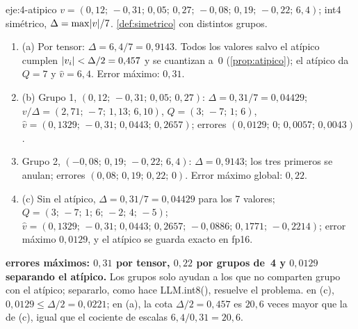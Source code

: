 \begin{solucion}{eje:4-atipico}
\datos $v=(0{,}12;\allowbreak\,-0{,}31;\allowbreak\,0{,}05;\allowbreak\,0{,}27;\allowbreak\,-0{,}08;\allowbreak\,0{,}19;\allowbreak\,-0{,}22;\allowbreak\,6{,}4)$; int4 simétrico, $\Delta=\max\lvert v\rvert/7$.
\planteamiento \cref{def:simetrico} con distintos grupos.
\pasos
\begin{enumerate}[label=\arabic*.]
  \item (a) Por tensor: $\Delta=6{,}4/7=0{,}9143$. Todos los valores salvo el atípico cumplen $\lvert v_i\rvert<\Delta/2=0{,}457$ y se cuantizan a~0 (\cref{prop:atipico}); el atípico da $Q=7$ y $\hat v=6{,}4$. Error máximo: $0{,}31$.
  \item (b) Grupo 1, $(0{,}12;\allowbreak\,-0{,}31;\allowbreak\,0{,}05;\allowbreak\,0{,}27)$: $\Delta=0{,}31/7=0{,}04429$; $v/\Delta=(2{,}71;\allowbreak\,-7;\allowbreak\,1{,}13;\allowbreak\,6{,}10)$, $Q=(3;\allowbreak\,-7;\allowbreak\,1;\allowbreak\,6)$, $\hat v=(0{,}1329;\allowbreak\,-0{,}31;\allowbreak\,0{,}0443;\allowbreak\,0{,}2657)$; errores $(0{,}0129;\allowbreak\,0;\allowbreak\,0{,}0057;\allowbreak\,0{,}0043)$.
  \item Grupo 2, $(-0{,}08;\allowbreak\,0{,}19;\allowbreak\,-0{,}22;\allowbreak\,6{,}4)$: $\Delta=0{,}9143$; los tres primeros se anulan; errores $(0{,}08;\allowbreak\,0{,}19;\allowbreak\,0{,}22;\allowbreak\,0)$. Error máximo global: $0{,}22$.
  \item (c) Sin el atípico, $\Delta=0{,}31/7=0{,}04429$ para los 7 valores; $Q=(3;\allowbreak\,-7;\allowbreak\,1;\allowbreak\,6;\allowbreak\,-2;\allowbreak\,4;\allowbreak\,-5)$; $\hat v=(0{,}1329;\allowbreak\,-0{,}31;\allowbreak\,0{,}0443;\allowbreak\,0{,}2657;\allowbreak\,-0{,}0886;\allowbreak\,0{,}1771;\allowbreak\,-0{,}2214)$; error máximo $0{,}0129$, y el atípico se guarda exacto en fp16.
\end{enumerate}
\resultado \textbf{errores máximos: $0{,}31$ por tensor, $0{,}22$ por grupos de~4 y $0{,}0129$ separando el atípico.} Los grupos solo ayudan a los que no comparten grupo con el atípico; separarlo, como hace LLM.int8(), resuelve el problema.
\comprobacion en (c), $0{,}0129\le\Delta/2=0{,}0221$; en (a), la cota $\Delta/2=0{,}457$ es $20{,}6$ veces mayor que la de (c), igual que el cociente de escalas $6{,}4/0{,}31=20{,}6$.
\end{solucion}


